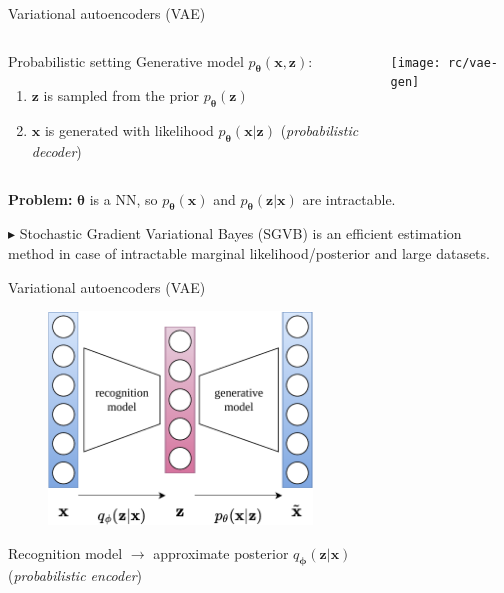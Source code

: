 \documentclass{beamer}
\begin{document}
  \begin{frame}{Variational autoencoders (VAE)}

    
    \begin{columns}[T,onlytextwidth]

      \begin{block}{Probabilistic setting}
        Generative model $p_{\boldsymbol{\theta}}(\mathbf{x}, \mathbf{z})$:
        \begin{enumerate}
          \item $\mathbf{z}$ is sampled from the \alert{prior} $p_{\boldsymbol{\theta}}(\mathbf{z})$
          \item $\mathbf{x}$ is generated with \alert{likelihood} $p_{\boldsymbol{\theta}}(\mathbf{x}|\mathbf{z})$ (\emph{probabilistic decoder})
        \end{enumerate}
      \end{block}

      \texttt{[image: rc/vae-gen]}
      
    \end{columns}
    \vspace{0.5cm}
    \textbf{Problem:} $\boldsymbol{\theta}$ is a NN, so $p_{\boldsymbol{\theta}}(\mathbf{x})$ and $p_{\boldsymbol{\theta}}(\mathbf{z}|\mathbf{x})$ are intractable.
    
    $\blacktriangleright$ Stochastic Gradient Variational Bayes (SGVB) \cite{Kingma2014} is an efficient estimation method in case of intractable marginal likelihood/posterior and large datasets.

  \end{frame}

  \begin{frame}{Variational autoencoders (VAE)}

    \begin{figure}
      \includegraphics[width=7cm]{rc/vae}
    \end{figure}

    Recognition model $\rightarrow$ \alert{approximate posterior} $q_{\boldsymbol{\phi}}(\mathbf{z}|\mathbf{x})$\\
    (\emph{probabilistic encoder})

  \end{frame}
\end{document}
